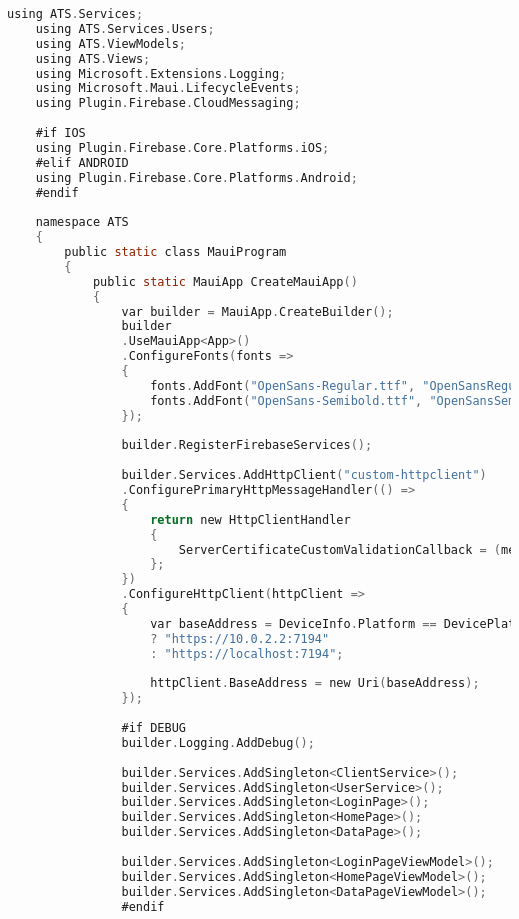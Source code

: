 \begin{lstlisting}[language=C, caption=Firebase initialisatie en dependency injection, label=lst:pushnotification-mauiprogram]
    using ATS.Services;
    using ATS.Services.Users;
    using ATS.ViewModels;
    using ATS.Views;
    using Microsoft.Extensions.Logging;
    using Microsoft.Maui.LifecycleEvents;
    using Plugin.Firebase.CloudMessaging;
    
    #if IOS
    using Plugin.Firebase.Core.Platforms.iOS;
    #elif ANDROID
    using Plugin.Firebase.Core.Platforms.Android;
    #endif
    
    namespace ATS
    {
        public static class MauiProgram
        {
            public static MauiApp CreateMauiApp()
            {
                var builder = MauiApp.CreateBuilder();
                builder
                .UseMauiApp<App>()
                .ConfigureFonts(fonts =>
                {
                    fonts.AddFont("OpenSans-Regular.ttf", "OpenSansRegular");
                    fonts.AddFont("OpenSans-Semibold.ttf", "OpenSansSemibold");
                });
                
                builder.RegisterFirebaseServices();
                
                builder.Services.AddHttpClient("custom-httpclient")
                .ConfigurePrimaryHttpMessageHandler(() =>
                {
                    return new HttpClientHandler
                    {
                        ServerCertificateCustomValidationCallback = (message, cert, chain, errors) => true
                    };
                })
                .ConfigureHttpClient(httpClient =>
                {
                    var baseAddress = DeviceInfo.Platform == DevicePlatform.Android
                    ? "https://10.0.2.2:7194"
                    : "https://localhost:7194";
                    
                    httpClient.BaseAddress = new Uri(baseAddress);
                });
                
                #if DEBUG
                builder.Logging.AddDebug();
                
                builder.Services.AddSingleton<ClientService>();
                builder.Services.AddSingleton<UserService>();
                builder.Services.AddSingleton<LoginPage>();
                builder.Services.AddSingleton<HomePage>();
                builder.Services.AddSingleton<DataPage>();
                
                builder.Services.AddSingleton<LoginPageViewModel>();
                builder.Services.AddSingleton<HomePageViewModel>();
                builder.Services.AddSingleton<DataPageViewModel>();
                #endif
                

\end{lstlisting}
